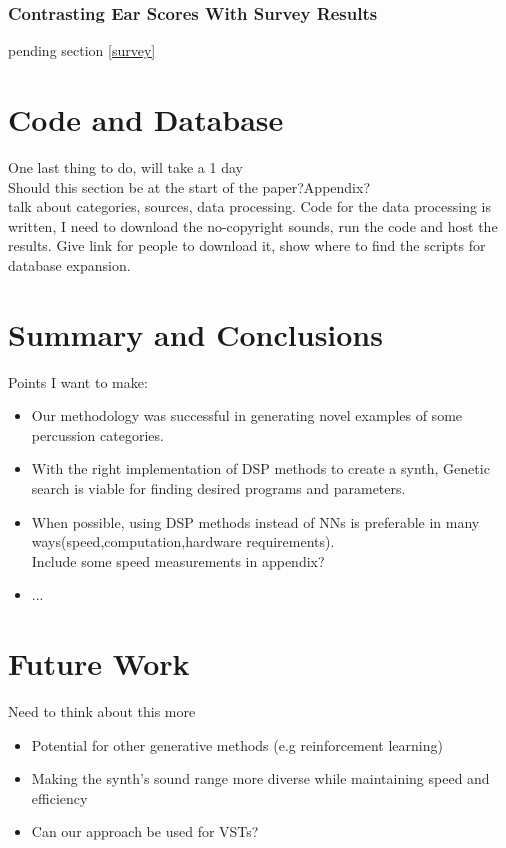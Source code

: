 \documentclass{nime-alternate} %
\begin{document}
\subsubsection{Contrasting Ear Scores With Survey Results}
\colorbox{green!=30}{pending section \ref{survey}}
\section{Code and Database}
\colorbox{green!=30}{One last thing to do, will take a 1 day}\\
\colorbox{blue!=30}{Should this section be at the start of the paper?Appendix?}\\
talk about  categories, sources, data processing. 
Code for the data processing is written, I need to download the no-copyright sounds, run the code and host the results. 
Give link for people to download it, show where to find the scripts for database expansion.
\section{Summary and Conclusions}
\colorbox{green!=30}{Points I want to make:}
\begin{itemize}
    \item Our methodology was successful in generating novel examples of some percussion categories.
    \item With the right implementation of DSP methods to create a synth, Genetic search is viable for finding  desired programs and parameters.
    \item When possible, using DSP methods instead of NNs is preferable in many ways(speed,computation,hardware requirements).\\
    \colorbox{green!=30}{Include some speed measurements in appendix?}
    \item ...
\end{itemize}
\section{Future Work}
\colorbox{blue!=30}{Need to think about this more}
\begin{itemize}
    \item Potential for other generative methods (e.g reinforcement learning)
    \item Making the synth's sound range more diverse while maintaining speed and efficiency
    \item Can our approach be used for VSTs?
\end{itemize}
\end{document}
